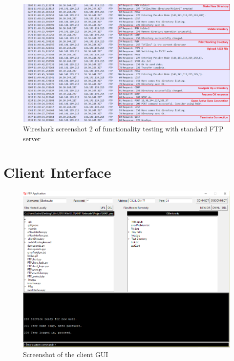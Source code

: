 \documentclass[10pt,twocolumn]{witseiepaper}
\begin{document}
\begin{appendix}
\begin{figure}[h]
\centering
\includegraphics[width=0.9\columnwidth]{WitsServerCapture2.png}
\caption{Wireshark screenshot 2 of functionality testing with standard FTP server}
\raggedright
\label{fig:WitsWS2}
\end{figure}

\newpage

\section{Client Interface}\label{sec:GUIAppendix}
\begin{figure}[h]
\centering
\includegraphics[width=0.9\columnwidth]{interface.png}
\caption{Screenshot of the client GUI}
\raggedright
\label{fig:ClientGUI}
\end{figure}

\end{appendix} 	

\end{document}
